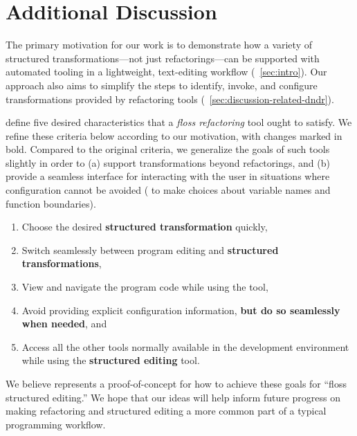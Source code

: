 \section{Additional Discussion}

The primary motivation for
our work is to demonstrate how a variety of structured
transformations---not just refactorings---can be supported with
automated tooling in a lightweight, text-editing workflow
(\cf{}~\autoref{sec:intro}). Our approach also aims to
simplify the steps to identify, invoke, and configure
transformations provided by refactoring tools
(\cf{}~\autoref{sec:discussion-related-dndr}).

\citet{FlossRefactoring} define five desired characteristics that a
\emph{floss refactoring} tool ought to satisfy. We refine these
criteria below according to our motivation, with changes marked in bold.
Compared to the original
criteria, we generalize the goals of such tools slightly in order to
(a) support transformations beyond refactorings, and (b) provide a seamless
interface for interacting with the user in situations where
configuration cannot be avoided (\eg{} to make choices about variable
names and function boundaries).


\begin{enumerate}
\item Choose the desired \textbf{structured transformation} quickly,
\item Switch seamlessly between program editing and
\textbf{structured transformations},
\item View and navigate the program code while using the tool,
\item Avoid providing explicit configuration information,
\textbf{but do so seamlessly when needed}, and
\item Access all the other
tools normally available in the
development environment while using the \textbf{structured editing}
tool.
\end{enumerate}

\noindent
We believe \deuce{} represents a proof-of-concept for how to achieve
these goals for ``floss structured editing.''
We hope that our ideas will help inform future progress on making
refactoring and structured editing a more common part of a typical
programming workflow.

